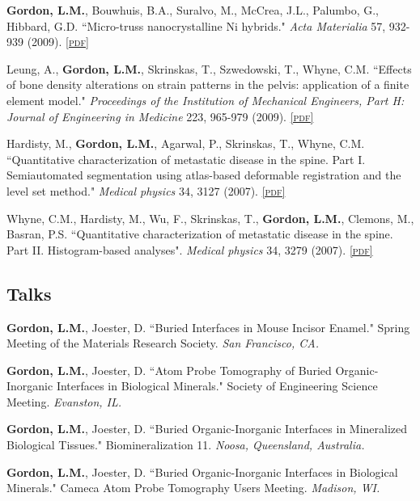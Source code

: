 \textbf{Gordon, L.M.}, Bouwhuis, B.A., Suralvo, M., McCrea, J.L., Palumbo, G., Hibbard, G.D. ``Micro-truss nanocrystalline Ni hybrids." \emph{Acta Materialia} 57, 932-939 (2009). \href{http://www.lylegordon.ca/papers/Gordon_et_al_Acta_materialia_2008.pdf}{\textsc{\footnotesize{[pdf]}}}

Leung, A., \textbf{Gordon, L.M.}, Skrinskas, T., Szwedowski, T., Whyne, C.M. ``Effects of bone density alterations on strain patterns in the pelvis: application of a finite element model." \emph{Proceedings of the Institution of Mechanical Engineers, Part H: Journal of Engineering in Medicine} 223, 965-979 (2009). \href{http://www.lylegordon.ca/papers/Leung_et_al_Journal_of_Engineering_in_Medicine_2009.pdf}{\textsc{\footnotesize{[pdf]}}}

Hardisty, M., \textbf{Gordon, L.M.}, Agarwal, P., Skrinskas, T., Whyne, C.M. ``Quantitative characterization of metastatic disease in the spine. Part I. Semiautomated segmentation using atlas-based deformable registration and the level set method." \emph{Medical physics} 34, 3127 (2007). \href{http://www.lylegordon.ca/papers/Hardisty_et_al_Medical_Physics_2007.pdf}{\textsc{\footnotesize{[pdf]}}}

Whyne, C.M., Hardisty, M., Wu, F., Skrinskas, T., \textbf{Gordon, L.M.}, Clemons, M., Basran, P.S. ``Quantitative characterization of metastatic disease in the spine. Part II. Histogram-based analyses". \emph{Medical physics} 34, 3279 (2007). \href{http://www.lylegordon.ca/papers/Whyne_et_al_Medical_Physics_2007.pdf}{\textsc{\footnotesize{[pdf]}}}
\endgroup

\subsection*{Talks}
\textbf{Gordon, L.M.}, Joester, D. ``Buried Interfaces in Mouse Incisor Enamel." Spring Meeting of the Materials Research Society. \emph{San Francisco, CA.}

\begingroup\setlength{\parskip}{0.15cm}
\textbf{Gordon, L.M.}, Joester, D. ``Atom Probe Tomography of Buried Organic-Inorganic Interfaces in Biological Minerals." Society of Engineering Science Meeting. \emph{Evanston, IL.}

\textbf{Gordon, L.M.}, Joester, D. ``Buried Organic-Inorganic Interfaces in Mineralized Biological Tissues." Biomineralization 11. \emph{Noosa, Queensland, Australia.}

\textbf{Gordon, L.M.}, Joester, D. ``Buried Organic-Inorganic Interfaces in Biological Minerals." Cameca Atom Probe Tomography Users Meeting. \emph{Madison, WI.}

